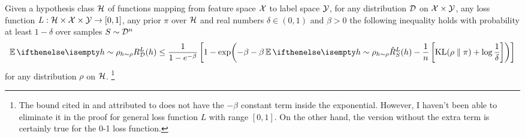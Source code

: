 \begin{theorem}
  \label{thm:catoni}
  Given a hypothesis class $\mathcal{H}$ of functions mapping from feature space $\mathcal{X}$
  to label space $\mathcal{Y}$, for any distribution $\mathcal{D}$ on $\mathcal{X} \times \mathcal{Y}$, any loss
  function $L : \mathcal{H} \times \mathcal{X} \times \mathcal{Y} \to [0, 1]$, any prior $\pi$ over
  $\mathcal{H}$ and real numbers $\delta \in (0, 1)$ and $\beta > 0$ the following
  inequality holds with probability at least $1 - \delta$ over samples $S \sim
  \mathcal{D}^n$
  \begin{equation}
    \label{eq:catoni-bound-unit}
    \Ev[h \sim \rho]{R_\CD^L(h)} \leq \frac{1}{1 - e^{-\beta}} \left[1 -
    \exp(-\beta - \beta \Ev[h \sim \rho]{\hat{R}_S^L(h)} - \frac{1}{n}
    \left[\KL{\rho}{\pi} + \log \frac{1}{\delta}\right])\right]
  \end{equation}
  for any distribution $\rho$ on $\mathcal{H}$. \footnote{The bound cited in
  \cite{germain2016pac} and attributed to \cite{catoni2007pac} does not have the
  $-\beta$ constant term inside the exponential. However, I haven't been able to
  eliminate it in the proof for general loss function $L$ with range $[0, 1]$.
  On the other hand, the version without the extra term is certainly true for
  the 0-1 loss function.}
\end{theorem}

